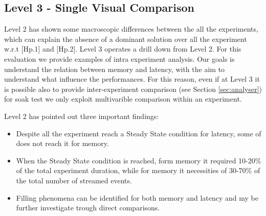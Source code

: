 






\subsection{Level 3 - Single Visual Comparison}\label{sec:eval-level3}
	
Level 2 has shown some macroscopic differences between the all the experiments, which can explain the absence of a dominant solution over all the experiment w.r.t [Hp.1] and [Hp.2]. Level 3 operates a drill down from Level 2. For this evaluation we provide examples of intra experiment analysis. Our goals is understand the relation between memory and latency, with the aim to understand what influence the performances. For this reason, even if at Level 3 it is possible also to provide inter-experiment comparison (see Section \ref{sec:analyser}) for soak test we only exploit multivarible comparison within an experiment.

Level 2 has pointed out three important findings:
\begin{itemize}
\item Despite all the experiment reach a Steady State condition for latency, some of does not reach it for memory.
\item When the Steady State condition is reached, form memory it required 10-20\% of the total experiment duration, while for memory it necessities of 30-70\% of the total number of streamed events.
\item Filling phenomena can be identified for both memory and latency and my be further investigate trough direct comparisons.
\end{itemize}

